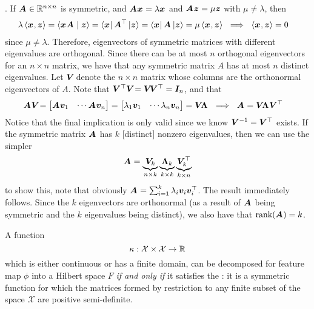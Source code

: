 \documentclass[11pt]{article}
\renewcommand\vec[2][]{\bm{#2}_{#1}}
\newcommand\mc{\mathcal}
\begin{document}
. If $\matr A \in \R^{n \times n}$ is symmetric, and $\matr A \vec x = \lambda \vec x$ and $\matr A \vec z = \mu \vec z$ with $\mu \neq \lambda$, then 
\begin{align}
	\lambda \innerprod{\vec x}{\vec z}
		&= \braket{\vec x \matr A \mid \vec z} = \bra{\vec x} \matr{A}^\top \ket{\vec z} = \bra{\vec x} \matr A \ket{\vec z} = \mu \innerprod{\vec x}{\vec z} ~ \implies ~ \innerprod{\vec x}{\vec z} = 0
\end{align}
since $\mu \neq \lambda$. Therefore, eigenvectors of symmetric matrices with different eigenvalues are orthogonal. Since there can be at most $n$ orthogonal eigenvectors for an $n \times n$ matrix, we have that any symmetric matrix $A$ has at most $n$ distinct eigenvalues. Let $\matr V$ denote the $n \times n$ matrix whose columns are the orthonormal eigenvectors of $A$. Note that $\matr{V}^\top \matr V = \matr V \matr{V}^\top = \matr[n]{I}$, and that 
\begin{align}
	\matr A \matr V 
		 &= \begin{bmatrix}
		 	\matr A \vec[1]{v} & \cdots \matr A \vec[n]{v} 
		 \end{bmatrix} 
	 	= \begin{bmatrix}
	 		\lambda_1 \vec[1]{v} & \cdots \lambda_n \vec[n]{v}
	 	\end{bmatrix} 
 	= \matr V \matr \Lambda 
 	~ \implies ~ \matr A = \matr V \matr \Lambda \matr V^\top
\end{align}
Notice that the final implication is only valid since we know $\minv{V} = \matr V^\top$ exists. If the symmetric matrix $\matr A$ has $k$ [distinct] nonzero eigenvalues, then we can use the simpler 
\begin{align}
	\matr A = \underbrace{ \matr[k]{V}}_{n \times k} 
		\underbrace{ \matr[k]{\Lambda} }_{k \times k} 
		\underbrace{ \matr[k]{V}^\top }_{k \times n}
\end{align}
to show this, note that obviously $\matr A = \sum_{i=1}^k \lambda_i \vec[i]{v} \vec[i]{v}^\top$. The result immediately follows. Since the $k$ eigenvectors are orthonormal (as a result of $\matr A$ being symmetric and the $k$ eigenvalues being distinct), we also have that $\text{rank}(\matr A) = k$. 

\begin{definition}
	A function
	$$
		\kappa: \mc X \times \mc X \to \R
	$$
	which is either continuous or has a finite domain, can be decomposed 
	\graybox{
		\kappa(\vec x, \vec z) = \innerprod{\vec\phi(\vec x)}{ \vec\phi(\vec z)} \label{eq:kappa-decomposed}
	}
	for feature map $\phi$ into a Hilbert space $F$ \textit{if and only if} it satisfies the : it is a symmetric function for which the matrices formed by restriction to any finite subset of the space $\mc X$ are positive semi-definite. 
\end{definition}
\end{document}
